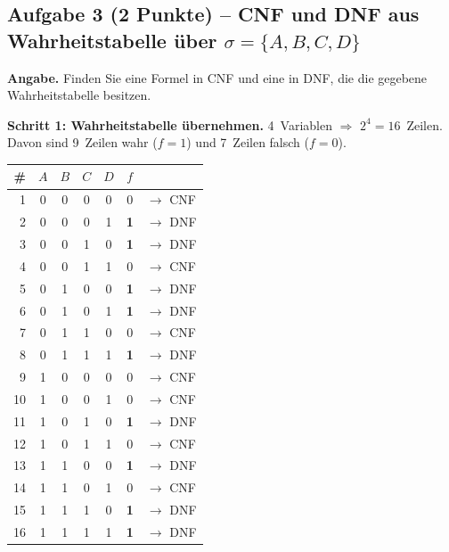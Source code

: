 \documentclass[a4paper,12pt]{article}
\begin{document}
\newpage

\subsection*{Aufgabe 3 \textnormal{(2 Punkte)} -- CNF und DNF aus
Wahrheitstabelle \"uber $\sigma = \{A,B,C,D\}$}

\textbf{Angabe.} Finden Sie eine Formel in CNF und eine in DNF,
die die gegebene Wahrheitstabelle besitzen.

\medskip
\textbf{Schritt 1: Wahrheitstabelle \"ubernehmen.}
4~Variablen $\Rightarrow$ $2^4 = 16$~Zeilen.
Davon sind 9~Zeilen wahr ($f=1$) und 7~Zeilen falsch ($f=0$).

\begin{center}
\renewcommand{\arraystretch}{1.1}
\begin{tabular}{r|cccc|c|l}
\toprule
\# & $A$ & $B$ & $C$ & $D$ & $f$ & \\
\midrule
 1 & 0 & 0 & 0 & 0 & 0 & $\to$ CNF \\
 2 & 0 & 0 & 0 & 1 & \textbf{1} & $\to$ DNF \\
 3 & 0 & 0 & 1 & 0 & \textbf{1} & $\to$ DNF \\
 4 & 0 & 0 & 1 & 1 & 0 & $\to$ CNF \\
 5 & 0 & 1 & 0 & 0 & \textbf{1} & $\to$ DNF \\
 6 & 0 & 1 & 0 & 1 & \textbf{1} & $\to$ DNF \\
 7 & 0 & 1 & 1 & 0 & 0 & $\to$ CNF \\
 8 & 0 & 1 & 1 & 1 & \textbf{1} & $\to$ DNF \\
 9 & 1 & 0 & 0 & 0 & 0 & $\to$ CNF \\
10 & 1 & 0 & 0 & 1 & 0 & $\to$ CNF \\
11 & 1 & 0 & 1 & 0 & \textbf{1} & $\to$ DNF \\
12 & 1 & 0 & 1 & 1 & 0 & $\to$ CNF \\
13 & 1 & 1 & 0 & 0 & \textbf{1} & $\to$ DNF \\
14 & 1 & 1 & 0 & 1 & 0 & $\to$ CNF \\
15 & 1 & 1 & 1 & 0 & \textbf{1} & $\to$ DNF \\
16 & 1 & 1 & 1 & 1 & \textbf{1} & $\to$ DNF \\
\bottomrule
\end{tabular}
\end{center}
\end{document}
